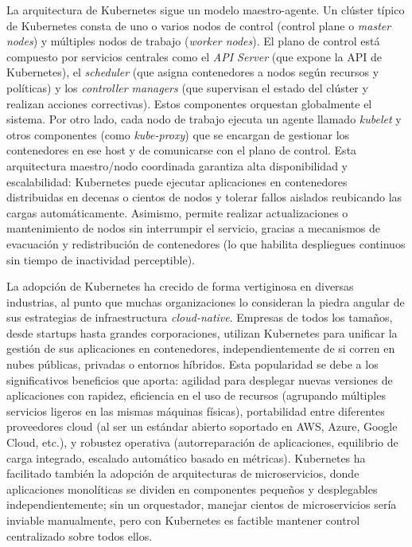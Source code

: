\documentclass[12pt,twoside,titlepage]{report}
\begin{document}
La arquitectura de Kubernetes sigue un modelo maestro-agente. Un clúster típico de Kubernetes consta de uno o varios nodos de control (control plane o \textit{master nodes}) y múltiples nodos de trabajo (\textit{worker nodes}). El plano de control está compuesto por servicios centrales como el \textit{API Server} (que expone la API de Kubernetes), el \textit{scheduler} (que asigna contenedores a nodos según recursos y políticas) y los \textit{controller managers} (que supervisan el estado del clúster y realizan acciones correctivas). Estos componentes orquestan globalmente el sistema. Por otro lado, cada nodo de trabajo ejecuta un agente llamado \textit{kubelet} y otros componentes (como \textit{kube-proxy}) que se encargan de gestionar los contenedores en ese host y de comunicarse con el plano de control. Esta arquitectura maestro/nodo coordinada garantiza alta disponibilidad y escalabilidad: Kubernetes puede ejecutar aplicaciones en contenedores distribuidas en decenas o cientos de nodos y tolerar fallos aislados reubicando las cargas automáticamente. Asimismo, permite realizar actualizaciones o mantenimiento de nodos sin interrumpir el servicio, gracias a mecanismos de evacuación y redistribución de contenedores (lo que habilita despliegues continuos sin tiempo de inactividad perceptible). 

La adopción de Kubernetes ha crecido de forma vertiginosa en diversas industrias, al punto que muchas organizaciones lo consideran la piedra angular de sus estrategias de infraestructura \textit{cloud-native}. Empresas de todos los tamaños, desde startups hasta grandes corporaciones, utilizan Kubernetes para unificar la gestión de sus aplicaciones en contenedores, independientemente de si corren en nubes públicas, privadas o entornos híbridos. Esta popularidad se debe a los significativos beneficios que aporta: agilidad para desplegar nuevas versiones de aplicaciones con rapidez, eficiencia en el uso de recursos (agrupando múltiples servicios ligeros en las mismas máquinas físicas), portabilidad entre diferentes proveedores cloud (al ser un estándar abierto soportado en AWS, Azure, Google Cloud, etc.), y robustez operativa (autorreparación de aplicaciones, equilibrio de carga integrado, escalado automático basado en métricas). Kubernetes ha facilitado también la adopción de arquitecturas de microservicios, donde aplicaciones monolíticas se dividen en componentes pequeños y desplegables independientemente; sin un orquestador, manejar cientos de microservicios sería inviable manualmente, pero con Kubernetes es factible mantener control centralizado sobre todos ellos. 
\end{document}
